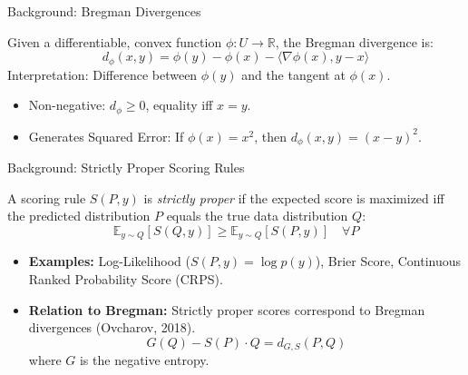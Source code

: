 \documentclass[aspectratio=169, 10pt]{beamer}
\begin{document}
\begin{frame}{Background: Bregman Divergences}
    \begin{definition}
        Given a differentiable, convex function $\phi: U \to \mathbb{R}$, the Bregman divergence is:
        \[
        d_\phi(x, y) = \phi(y) - \phi(x) - \langle \nabla \phi(x), y - x \rangle
        \]
        Interpretation: Difference between $\phi(y)$ and the tangent at $\phi(x)$.
    \end{definition}
    \begin{itemize}
        \item Non-negative: $d_\phi \ge 0$, equality iff $x = y$.
        \item Generates Squared Error: If $\phi(x) = x^2$, then $d_\phi(x,y) = (x-y)^2$.
    \end{itemize}
    
\end{frame}

\begin{frame}{Background: Strictly Proper Scoring Rules}
    \begin{definition}
        A scoring rule $S(P, y)$ is \emph{strictly proper} if the expected score is maximized iff the predicted distribution $P$ equals the true data distribution $Q$:
        \[
        \mathbb{E}_{y \sim Q}[S(Q, y)] \ge \mathbb{E}_{y \sim Q}[S(P, y)] \quad \forall P
        \]
    \end{definition}
    \begin{itemize}
        \item \textbf{Examples:} Log-Likelihood ($S(P,y)=\log p(y)$), Brier Score, Continuous Ranked Probability Score (CRPS).
        \item \textbf{Relation to Bregman:} Strictly proper scores correspond to Bregman divergences (Ovcharov, 2018).
        \[
        G(Q) - S(P) \cdot Q = d_{G,S}(P, Q)
        \]
        where $G$ is the negative entropy.
    \end{itemize}
\end{frame}
\end{document}

